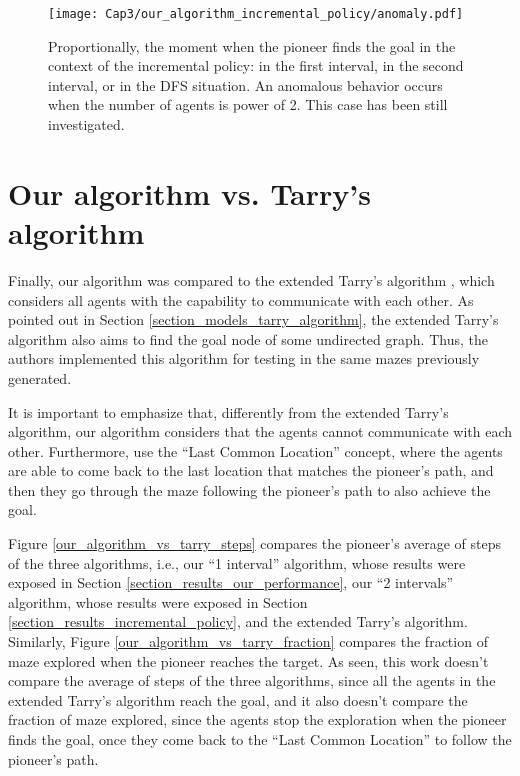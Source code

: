 \begin{figure}[ht!]
\centering
\texttt{[image: Cap3/our\_algorithm\_incremental\_policy/anomaly.pdf]}
\caption{Proportionally, the moment when the pioneer finds the goal in the context of the incremental policy: in the first interval, in the second interval, or in the DFS situation. An anomalous behavior occurs when the number of agents is power of 2. This case has been still investigated.}
\label{incremental_policy_anomaly}
\end{figure}

\section{Our algorithm vs. Tarry's algorithm}
\label{section_results_tarry_vs_our}

Finally, our algorithm was compared to the extended Tarry's algorithm \cite{KivelevitchCohen2010}, which considers all agents with the capability to communicate with each other. As pointed out in Section \ref{section_models_tarry_algorithm}, the extended Tarry's algorithm also aims to find the goal node of some undirected graph. Thus, the authors implemented this algorithm for testing in the same mazes previously generated.

It is important to emphasize that, differently from the extended Tarry's algorithm, our algorithm considers that the agents cannot communicate with each other. Furthermore,  use the ``Last Common Location'' concept, where the agents are able to come back to the last location that matches the pioneer's path, and then they go through the maze following the pioneer's path to also achieve the goal.

Figure \ref{our_algorithm_vs_tarry_steps} compares the pioneer's average of steps of the three algorithms, i.e., our ``1 interval'' algorithm, whose results were exposed in Section \ref{section_results_our_performance}, our ``2 intervals'' algorithm, whose results were exposed in Section \ref{section_results_incremental_policy}, and the extended Tarry's algorithm. Similarly, Figure \ref{our_algorithm_vs_tarry_fraction} compares the fraction of maze explored when the pioneer reaches the target. As seen, this work doesn't compare the average of steps of the three algorithms, since all the agents in the extended Tarry's algorithm reach the goal, and it also doesn't compare the fraction of maze explored, since the agents stop the exploration when the pioneer finds the goal, once they come back to the ``Last Common Location'' to follow the pioneer's path.

